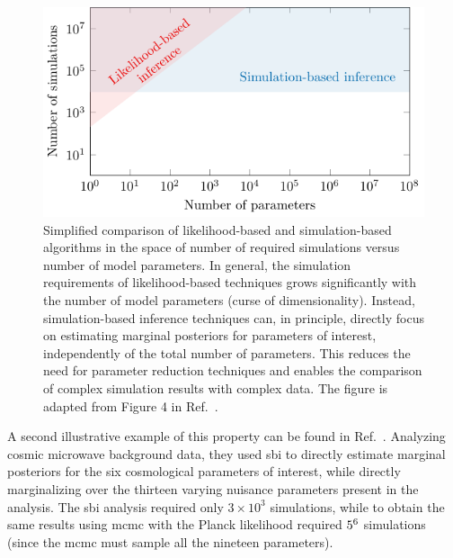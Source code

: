 \begin{figure}
    \centering
    \includegraphics[width=0.9\linewidth]{TikZ/curse_of_dim.pdf}
	\caption{Simplified comparison of likelihood-based and simulation-based algorithms in the space of number of required simulations versus number of model parameters. In general, the simulation requirements of likelihood-based techniques grows significantly with the number of model parameters (curse of dimensionality). Instead, simulation-based inference techniques can, in principle, directly focus on estimating marginal posteriors for parameters of interest, independently of the total number of parameters. This reduces the need for parameter reduction techniques and enables the comparison of complex simulation results with complex data. The figure is adapted from Figure 4 in Ref.~\cite{Boddy:2022knd}.}
    \label{fig:sbi-lbi-cost}
\end{figure}

A second illustrative example of this property can be found in Ref.~\cite{Cole:2021gwr}. Analyzing cosmic microwave background data, they used \gls*{sbi} to directly estimate marginal posteriors for the six cosmological parameters of interest, while directly marginalizing over the thirteen varying nuisance parameters present in the analysis. The \gls*{sbi} analysis required only $3\times10^3$ simulations, while to obtain the same results using \gls*{mcmc} with the Planck likelihood required $5\time10^6$ simulations (since the \gls*{mcmc} must sample all the nineteen parameters). 

